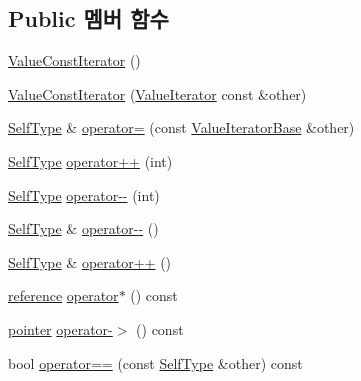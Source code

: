 \subsection*{Public 멤버 함수}
\begin{DoxyCompactItemize}
\item 
\hyperlink{class_json_1_1_value_const_iterator_a1b10a46f1606421b0663492a5f9a2aad}{Value\+Const\+Iterator} ()
\item 
\hyperlink{class_json_1_1_value_const_iterator_a7ef3df204a9ae83a0d8a3cd128e05c70}{Value\+Const\+Iterator} (\hyperlink{class_json_1_1_value_iterator}{Value\+Iterator} const \&other)
\item 
\hyperlink{class_json_1_1_value_iterator_base_a9d2a940d03ea06d20d972f41a89149ee}{Self\+Type} \& \hyperlink{class_json_1_1_value_const_iterator_ad1b1c11f8d7fb22d4d3c231915f2b15b}{operator=} (const \hyperlink{class_json_1_1_value_iterator_base}{Value\+Iterator\+Base} \&other)
\item 
\hyperlink{class_json_1_1_value_iterator_base_a9d2a940d03ea06d20d972f41a89149ee}{Self\+Type} \hyperlink{class_json_1_1_value_const_iterator_ab3f0c2edbfc8f7d60645f3d597d05e28}{operator++} (int)
\item 
\hyperlink{class_json_1_1_value_iterator_base_a9d2a940d03ea06d20d972f41a89149ee}{Self\+Type} \hyperlink{class_json_1_1_value_const_iterator_a94935961e9331c6f7b907b05ec8df75e}{operator-\/-\/} (int)
\item 
\hyperlink{class_json_1_1_value_iterator_base_a9d2a940d03ea06d20d972f41a89149ee}{Self\+Type} \& \hyperlink{class_json_1_1_value_const_iterator_a31415e44e44e56fb2bfda7e8bb784646}{operator-\/-\/} ()
\item 
\hyperlink{class_json_1_1_value_iterator_base_a9d2a940d03ea06d20d972f41a89149ee}{Self\+Type} \& \hyperlink{class_json_1_1_value_const_iterator_a2cfe2f7a94a688186efdafb1b181c319}{operator++} ()
\item 
\hyperlink{class_json_1_1_value_const_iterator_aa9b05c6a37cd352ea1ee6e13b816f709}{reference} \hyperlink{class_json_1_1_value_const_iterator_ae5612dad47a6387eef71d584fb741d0c}{operator$\ast$} () const
\item 
\hyperlink{class_json_1_1_value_const_iterator_a400136bd8bc09e9fddec0785fa2cff14}{pointer} \hyperlink{class_json_1_1_value_const_iterator_a3c608ae53c192ee846eb265bae1cfeec}{operator-\/$>$} () const
\item 
bool \hyperlink{class_json_1_1_value_iterator_base_a1248d8016f88b51371a0fcbd355b3cfd}{operator==} (const \hyperlink{class_json_1_1_value_iterator_base_a9d2a940d03ea06d20d972f41a89149ee}{Self\+Type} \&other) const

\end{DoxyCompactItemize}
